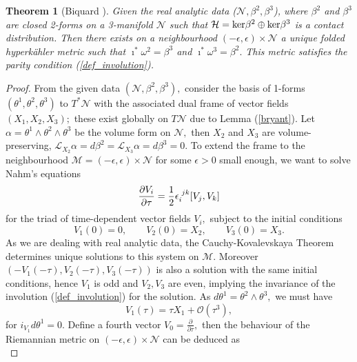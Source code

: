 \documentclass[a4paper,12pt, onecolumn, notitlepage]{article}
\newtheorem{thm}{Theorem}[]
\theoremstyle{definition}
\theoremstyle{remark}
\newcommand{\al}{\alpha}
\newcommand{\w}{\omega}
\newcommand{\e}{\epsilon}
\newcommand{\ddt}[1]{\frac{\partial #1}{\partial \tau}}
\newcommand{\HK}{hyperk\"ahler }
\begin{document}
\begin{thm}[Biquard \cite{biquard_2015}]
	\label{thm_biquard}
	Given the real analytic data ($\mathcal{N}, \beta^{2}, \beta^{3}$), where $\beta^{2}$ and $\beta^{3}$ are closed 2-forms on a 3-manifold $\mathcal{N}$ such that $\mathcal{H}=\textnormal{ker}\beta^{2}\oplus\textnormal{ker}\beta^{3}$ is a contact distribution. Then there exists on a neighbourhood $(-\e,\e)\times\mathcal{N}$ a unique folded \HK metric such that $\imath^{\ast}\w^{2}=\beta^{3}$ and $\imath^{\ast}\w^{3}=\beta^{2}.$ This metric satisfies the parity condition (\ref{def_involution}).
\end{thm}
\begin{proof}
	From the given data $(\mathcal{N},\beta^{2},\beta^{3}),$ consider the basis of 1-forms $(\theta^{1},\theta^{2},\theta^{3})$ to $T^{\ast}\mathcal{N}$ with the associated dual frame of vector fields $(X_{1},X_{2},X_{3});$ these exist globally on $T\mathcal{N}$ due to Lemma (\ref{bryant}). Let $\al=\theta^{1}\wedge\theta^{2}\wedge\theta^{3}$ be the volume form on $\mathcal{N},$ then $X_{2}$ and $X_{3}$ are volume-preserving, $\mathcal{L}_{X_2}\al=d\beta^{2}=\mathcal{L}_{X_3}\al=d\beta^{3}=0.$ To extend the frame to the neighbourhood $\mathcal{M}=(-\e,\e)\times\mathcal{N}$ for some $\e>0$ small enough, we want to solve Nahm's equations
	\begin{equation*}
		\ddt{V_{i}}=\frac{1}{2}\e\indices{_i^j^k}[V_{j},V_{k}]
	\end{equation*}
	for the triad of time-dependent vector fields $V_{i},$ subject to the initial conditions
	\begin{equation*}
		V_{1}(0)=0,\qquad V_{2}(0)=X_{2},\qquad V_{3}(0) = X_{3}.
	\end{equation*}
	As we are dealing with real analytic data, the Cauchy-Kovalevskaya Theorem \cite{evans_2010} determines unique solutions to this system on $\mathcal{M}.$ Moreover $(-V_{1}(-\tau),V_{2}(-\tau),V_{3}(-\tau))$ is also a solution with the same initial conditions, hence $V_{1}$ is odd and $V_{2}, V_{3}$ are even, implying the invariance of the involution (\ref{def_involution}) for the solution. As $d\theta^{1}=\theta^{2}\wedge\theta^{3},$ we must have
	\begin{equation*}
		V_{1}(\tau) = \tau X_{1} + \mathcal{O}(\tau^{3}),
	\end{equation*}
	for $i_{V_{1}}d\theta^{1}=0.$ Define a fourth vector $V_{0}=\ddt{},$ then the behaviour of the Riemannian metric on $(-\e,\e)\times\mathcal{N}$ can be deduced as
	\begin{equation*}

\end{equation*}
\end{proof}
\end{document}
